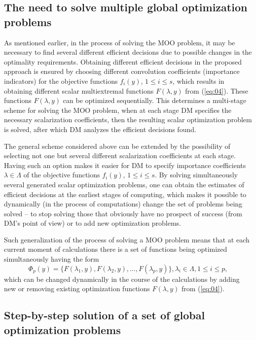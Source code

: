 \documentclass[runningheads]{llncs}
\begin{document}
\subsection{The need to solve multiple global optimization problems} 
\label{subsec:41}

As mentioned earlier, in the process of solving the MOO problem, it may be necessary to find several different efficient decisions due to possible changes in the optimality requirements. Obtaining different efficient decisions in the proposed approach is ensured by choosing different convolution coefficients (importance indicators) for the objective functions $f_i(y)$, $1 \leq i \leq s$, which results in obtaining different  scalar multiextremal functions $F(\lambda, y)$ from (\ref{eq:04}). These functions $F(\lambda, y)$ can be optimized sequentially. This determines a multi-stage scheme for solving the MOO problem, when at each stage DM specifies the necessary scalarization coefficients, then the resulting scalar optimization problem is solved, after which DM analyzes the efficient decisions found. 

The general scheme considered above can be extended by the possibility of selecting not one but several different scalarization coefficients at each stage. Having such an option makes it easier for DM  to specify importance coefficients $\lambda \in \Lambda$ of the objective functions $f_i(y)$, $1 \leq i \leq s$. By solving simultaneously several generated scalar optimization problems, one can  obtain the estimates of efficient decisions at the earliest stages of computing, which makes it possible to dynamically (in the process of computations) change the set of problems being solved -- to stop solving those that obviously have no prospect of success (from DM's point of view) or to add new optimization problems. 

Such generalization of the process of solving a MOO problem means that at each current moment of calculations there is a set of functions being optimized simultaneously having the form
\begin{equation}
\label{eq:21}
\Phi_p (y)=\{ F(\lambda_1,y), F(\lambda_2,y),\dots,F(\lambda_p,y)  \},  \lambda_i \in \Lambda, 1 \leq i \leq p,
\end{equation}
which can be changed dynamically in the course of the calculations by adding new or removing existing optimization functions $F(\lambda, y)$ from (\ref{eq:04}). 


\subsection{Step-by-step solution of a set of global optimization problems} 
\label{subsec:42}
\end{document}

